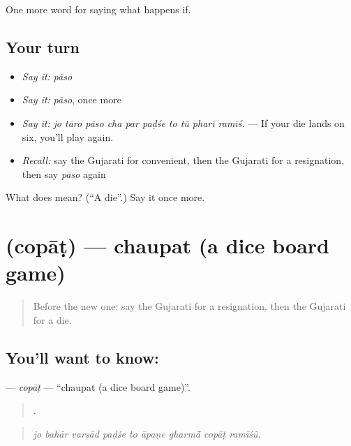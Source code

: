 \begin{grammarlens}[title={What you've built}]
One more word for saying what happens if.
\end{grammarlens}

\subsection*{Your turn}
\begin{itemize}
\raggedright
  \item \emph{Say it:} \emph{pāso}
  \item \emph{Say it:} \emph{pāso}, once more
  \item \emph{Say it:} \emph{jo tāro pāso cha par paḍśe to tũ pharī ramīś.} — If your die lands on six, you'll play again.
  \item \emph{Recall:} say the Gujarati for convenient, then the Gujarati for a resignation, then say \emph{pāso} again
\end{itemize}

\begin{tcolorbox}[breakable,colback=teal!4,colframe=teal!35!black,title={Before you move on}]
What does  mean? (\textquotedblleft{}A die\textquotedblright{}.) Say it once more.
\end{tcolorbox}
\section[\texorpdfstring{\gu{ચોપાટ} (copāṭ)}{ચોપાટ (copāṭ)}]{ (copāṭ) — chaupat (a dice board game)}

\label{lesson:GU-C533-copat}



\begin{quote}
Before the new one: say the Gujarati for a resignation, then the Gujarati for a die.
\end{quote}

\subsection*{You'll want to know: }
\textbf{} — \emph{copāṭ} — \textquotedblleft{}chaupat (a dice board game)\textquotedblright{}.

\begin{quote}
        .
\end{quote}

\begin{quote}
\emph{jo bahār varsād paḍśe to āpaṇe gharmā̃ copāṭ ramīśũ.}
\end{quote}

